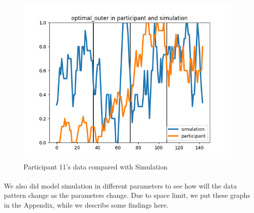 \begin{figure}[htb]
{\begin{minipage}[t]{0.48\textwidth}
\includegraphics[width=\textwidth]{Figures/11_optimal_outer}
\end{minipage}
}
\decoRule
\caption[Participant 11's data compared with Simulation]{Participant 11's data compared with Simulation}
\label{fig:Participant 11's data compared with Simulation}
\end{figure}

\paragraph{}
We also did model simulation in different parameters to see how will the data pattern change as the parameters change. Due to space limit, we put these graphs in the Appendix, while we describe some findings here. 

